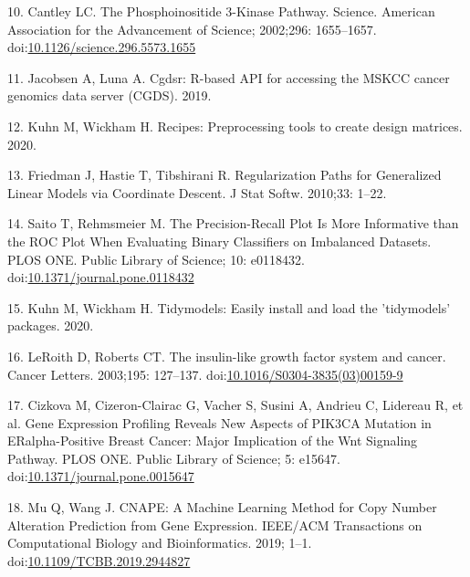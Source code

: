 \documentclass[10pt,letterpaper]{article}
\begin{document}
\leavevmode\hypertarget{ref-cantleyPhosphoinositide3KinasePathway2002}{}%
10. Cantley LC. The Phosphoinositide 3-Kinase Pathway. Science. American
Association for the Advancement of Science; 2002;296: 1655--1657.
doi:\href{https://doi.org/10.1126/science.296.5573.1655}{10.1126/science.296.5573.1655}

\leavevmode\hypertarget{ref-jacobsenCgdsrRbasedAPI2019}{}%
11. Jacobsen A, Luna A. Cgdsr: R-based API for accessing the MSKCC
cancer genomics data server (CGDS). 2019.

\leavevmode\hypertarget{ref-kuhnRecipesPreprocessingTools2020}{}%
12. Kuhn M, Wickham H. Recipes: Preprocessing tools to create design
matrices. 2020.

\leavevmode\hypertarget{ref-friedmanRegularizationPathsGeneralized2010}{}%
13. Friedman J, Hastie T, Tibshirani R. Regularization Paths for
Generalized Linear Models via Coordinate Descent. J Stat Softw. 2010;33:
1--22.

\leavevmode\hypertarget{ref-saitoPrecisionRecallPlotMore2015}{}%
14. Saito T, Rehmsmeier M. The Precision-Recall Plot Is More Informative
than the ROC Plot When Evaluating Binary Classifiers on Imbalanced
Datasets. PLOS ONE. Public Library of Science; 10: e0118432.
doi:\href{https://doi.org/10.1371/journal.pone.0118432}{10.1371/journal.pone.0118432}

\leavevmode\hypertarget{ref-kuhnTidymodelsEasilyInstall2020}{}%
15. Kuhn M, Wickham H. Tidymodels: Easily install and load the
'tidymodels' packages. 2020.

\leavevmode\hypertarget{ref-leroithInsulinlikeGrowthFactor2003}{}%
16. LeRoith D, Roberts CT. The insulin-like growth factor system and
cancer. Cancer Letters. 2003;195: 127--137.
doi:\href{https://doi.org/10.1016/S0304-3835(03)00159-9}{10.1016/S0304-3835(03)00159-9}

\leavevmode\hypertarget{ref-cizkovaGeneExpressionProfiling2010}{}%
17. Cizkova M, Cizeron-Clairac G, Vacher S, Susini A, Andrieu C,
Lidereau R, et al. Gene Expression Profiling Reveals New Aspects of
PIK3CA Mutation in ERalpha-Positive Breast Cancer: Major Implication of
the Wnt Signaling Pathway. PLOS ONE. Public Library of Science; 5:
e15647.
doi:\href{https://doi.org/10.1371/journal.pone.0015647}{10.1371/journal.pone.0015647}

\leavevmode\hypertarget{ref-muCNAPEMachineLearning2019}{}%
18. Mu Q, Wang J. CNAPE: A Machine Learning Method for Copy Number
Alteration Prediction from Gene Expression. IEEE/ACM Transactions on
Computational Biology and Bioinformatics. 2019; 1--1.
doi:\href{https://doi.org/10.1109/TCBB.2019.2944827}{10.1109/TCBB.2019.2944827}
\end{document}
